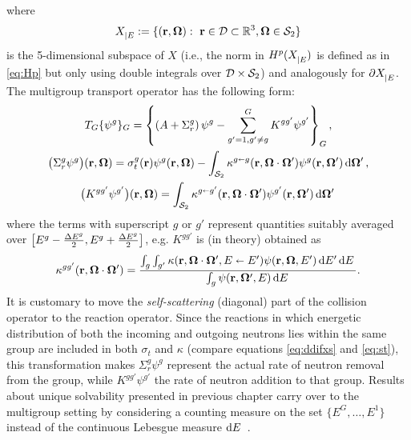 where
$$
	\XE := \{(\br,\bomega):\ \br\in \VV\subset\R[3], \bomega\in \Sphere\}
$$
is the 5-dimensional subspace of $X$ (i.e., the norm in $\Hp(\XE)$ is defined as
in \eqref{eq:Hp} but only using double integrals over $\VV\times\Sphere$) and analogously for $\pXE$.
The multigroup transport operator has the following form:
\begin{equation*}
\begin{gathered}
    T_G\{\psi^g\}_G = \left\{\left(A + \Sigma_r^g\right)\psi^g - \summ{g'=1,g'\neq g}{G}
    K^{gg'}\psi^{g'}\right\}_G,\\
    \bigl(\Sigma_r^g\psi^g\bigr)(\br,\bomega) = \sigma_t^g(\br)\psi^g(\br,\bomega) - \intA[']{\kappa^{g\sla
    g}(\br,\bomega\cdot\bomega')\psi^g(\br,\bomega')},\\ \bigl(K^{gg'}\psi^{g'}\bigr)(\br,\bomega) =
    \intA[']{\kappa^{g\sla g'}(\br,\bomega\cdot\bomega')\psi^{g'}(\br,\bomega')}
\end{gathered}
\end{equation*}
where the terms with superscript $g$ or $g'$ represent quantities suitably averaged over 
\mbox{$\bigl[E^{g}-\dEh{g}, E^{g}+\dEh{g}\bigr]$}, e.g. $K^{gg'}$ is (in theory) obtained as
\begin{equation}\label{eq:mg-kappa}
	\kappa^{gg'}(\br,\bomega\cdot\bomega') = \frac{\int_{g}\int_{g'} \kappa(\br,\bomega\cdot\bomega',E \sla
	E')\psi(\br,\bomega,E')\,\d{E'}\d{E}}{\int_{g}\psi(\br, \bomega', E)\,\d{E}}.
\end{equation}
It is customary to move the \textit{self-scattering} (diagonal) part of the
collision operator to the reaction operator. Since the reactions in which energetic distribution of both the incoming 
and outgoing neutrons lies within the same group are included in both $\sigma_t$ and $\kappa$  (compare equations
\eqref{eq:ddifxs} and \eqref{eq:st}), this transformation makes $\Sigma_r^g\psi^g$ represent the actual rate of neutron
removal from the group, while $K^{gg'}\psi^{g'}$ the rate of neutron addition to that group. Results about unique
solvability presented in previous chapter carry over to the multigroup setting by considering a counting measure on the
set $\{E^G,\ldots,E^1\}$ instead of the continuous Lebesgue measure $\d{E}$ \cite[Chap. XXI \S 2]{DautrayLions}.

